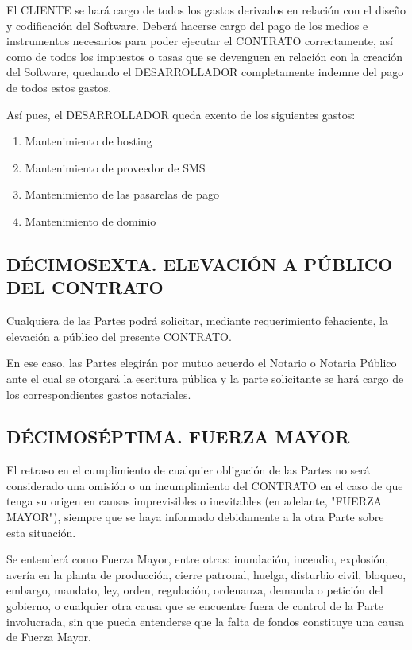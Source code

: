 \documentclass[a4paper,11pt]{report}
\begin{document}
	El CLIENTE se hará cargo de todos los gastos derivados en relación
	con el diseño y codificación del Software. Deberá hacerse cargo del pago
	de los medios e instrumentos necesarios para poder ejecutar el CONTRATO
	correctamente, así como de todos los impuestos o tasas que se devenguen
	en relación con la creación del Software, quedando el DESARROLLADOR
	completamente indemne del pago de todos estos gastos.

	Así pues, el DESARROLLADOR queda exento de los siguientes gastos:

	\begin{enumerate}
		\item Mantenimiento de hosting
		\item Mantenimiento de proveedor de SMS
		\item Mantenimiento de las pasarelas de pago
		\item Mantenimiento de dominio
	\end{enumerate}

	\subsection*{DÉCIMOSEXTA. ELEVACIÓN A PÚBLICO DEL CONTRATO}

	Cualquiera de las Partes podrá solicitar, mediante requerimiento
	fehaciente, la elevación a público del presente CONTRATO.

	En ese caso, las Partes elegirán por mutuo acuerdo el Notario o Notaria
	Público ante el cual se otorgará la escritura pública y la parte
	solicitante se hará cargo de los correspondientes gastos notariales.

	\subsection*{DÉCIMOSÉPTIMA. FUERZA MAYOR}

	El retraso en el cumplimiento de cualquier obligación de las Partes no
	será considerado una omisión o un incumplimiento del CONTRATO en el caso
	de que tenga su origen en causas imprevisibles o inevitables (en
	adelante, "FUERZA MAYOR"), siempre que se haya informado debidamente a
	la otra Parte sobre esta situación.

	Se entenderá como Fuerza Mayor, entre otras: inundación, incendio,
	explosión, avería en la planta de producción, cierre patronal, huelga,
	disturbio civil, bloqueo, embargo, mandato, ley, orden, regulación,
	ordenanza, demanda o petición del gobierno, o cualquier otra causa que
	se encuentre fuera de control de la Parte involucrada, sin que pueda
	entenderse que la falta de fondos constituye una causa de Fuerza Mayor.
\end{document}
